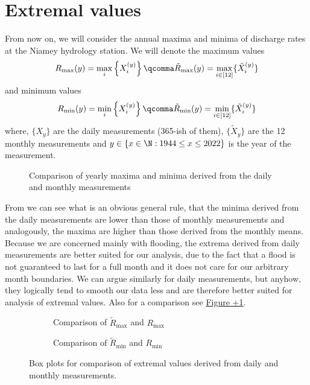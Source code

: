  \section{Extremal values}%
 \label{sec:extremal_values}
 From now on, we will consider the annual maxima and minima of discharge rates at the Niamey hydrology station. We will
 denote the maximum values \[
     R_{\max}(y) = \max_i \left\{ X^{(y)}_i \right\} \qcomma \tilde{R}_{\max}(y) = \max_{i \in [12]}\{ \tilde{X}^{(y)}_i \} 
 \] 
 and minimum values \[
     R_{\min}(y) = \min_i \left\{ X^{(y)}_i \right\} \qcomma \tilde{R}_{\min}(y) = \min_{i \in [12]}\{ \tilde{X}^{(y)}_i \}
 \] 
 where, \(\{X_{y}\}\) are the daily measurements (365-ish of them), \(\{\tilde{X}_{y}\}\) are the 12 monthly measurements 
 and \(y \in \left\{ x \in \N : 1944 \le x \le 2022 \right\}\) is the year of the measurement.

 \begin{figure}[h]
     \centering
     \caption{Comparison of yearly maxima and minima derived from the daily and monthly measurements}
     \label{fig:R_max_R_min_timeseries}
 \end{figure}

 From  we can see what is an obvious general rule, that the minima derived from the daily
 measurements are lower than those of monthly measurements and analogously, the maxima are higher than those
 derived from the monthly means. Because we are concerned mainly with flooding, the extrema derived from daily measurements are
 better suited for our analysis, due to the fact that a flood is not guaranteed to last for a full month and it does not
 care for our arbitrary month boundaries. We can argue similarly for daily measurements, but anyhow, they logically tend
 to smooth our data less and are therefore better suited for analysis of extremal values. Also for a comparison see
 \hyperref[fig:comp_max_min_day_month]{Figure \the\numexpr\thefigure+1\relax}.

 \begin{figure}[h]
    \centering
   \begin{subfigure}{0.4\textwidth}
    \label{fig:comp_max_min_day_month}
    \centering
    \caption{Comparison of \(\tilde{R}_{\max}\) and \(R_{\max}\)}
   \end{subfigure}
   \begin{subfigure}{0.4\textwidth}
    \centering
    \caption{Comparison of \(\tilde{R}_{\min}\) and \(R_{\min}\)}
   \end{subfigure}
   \caption{Box plots for comparison of extremal values derived from daily and monthly measurements.}
 \end{figure}

